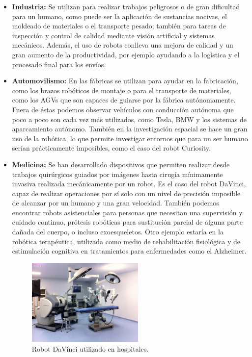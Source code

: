 \begin{itemize}
		\item \textbf{Industria: }Se utilizan para realizar trabajos peligrosos o de gran dificultad para un humano, como puede ser la aplicación de sustancias nocivas, el moldeado de materiales o el transporte pesado; también para tareas de inspección y control de calidad mediante visión artificial y sistemas mecánicos. Además, el uso de robots conlleva una mejora de calidad y un gran aumento de la productividad, por ejemplo ayudando a la logística y el procesado final para los envíos.
		\item \textbf{Automovilismo: }En las fábricas se utilizan para ayudar en la fabricación, como los brazos robóticos de montaje o para el transporte de materiales, como los AGVs que son capaces de guiarse por la fábrica autónomamente. Fuera de éstas podemos observar vehículos con conducción autónoma que poco a poco son cada vez más utilizados, como Tesla, BMW y los sistemas de aparcamiento autónomo. También en la investigación espacial se hace un gran uso de la robótica, lo que permite investigar entornos que para un ser humano serían prácticamente imposibles, como el caso del robot Curiosity.
		\item \textbf{Medicina: }Se han desarrollado dispositivos que permiten realizar desde trabajos quirúrgicos guiados por imágenes hasta cirugía mínimamente invasiva realizada mecánicamente por un robot. Es el caso del robot DaVinci, capaz de realizar operaciones por sí solo con un nivel de precisión imposible de alcanzar por un humano y una gran velocidad. También podemos encontrar robots asistenciales para personas que necesitan una supervisión y cuidado continuo, prótesis robóticas para sustitución parcial de alguna parte dañada del cuerpo, o incluso exoesqueletos. Otro ejemplo estaría en la robótica terapéutica, utilizada como medio de rehabilitación fisiológica y de estimulación cognitiva en tratamientos para enfermedades como el Alzheimer.
		
		\begin{figure}[H]
			\begin{center}
				\includegraphics[width=0.54\textwidth]{imag/IMG13.jpeg}
					\caption{Robot DaVinci utilizado en hospitales.}
			\label{fig:Robot DaVinci.}	
			\end{center}
		\end{figure}	
			

\end{itemize}
